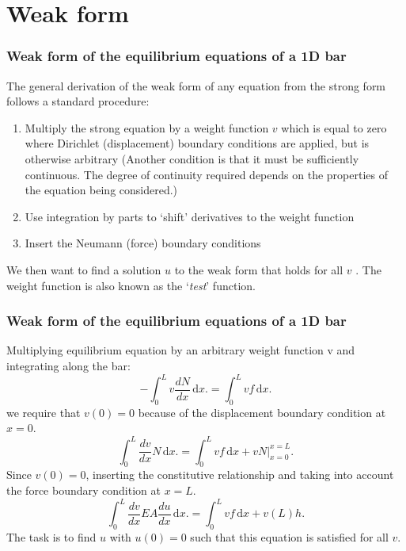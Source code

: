\documentclass[notes]{beamer}
\begin{document}
\section{Weak form}
\begin{frame}
\frametitle{Weak form of the equilibrium equations of a 1D bar}
The general derivation of the weak form of any equation from the strong form
follows a standard procedure:

\begin{enumerate}
	\item Multiply the strong equation by a weight function $v$ which is equal to zero where
	Dirichlet (displacement) boundary conditions are applied, but is otherwise arbitrary 
	(Another condition is that it must be sufficiently continuous. The degree of continuity 
	required depends on the properties of the equation being considered.)
	\item Use integration by parts to `shift' derivatives to the weight function
	\item Insert the Neumann (force) boundary conditions
\end{enumerate}

We then want to find a solution $u$ to the weak form that holds for all $v$ . The weight
function is also known as the `\textit{test}' function.
\end{frame}

\begin{frame}
\frametitle{Weak form of the equilibrium equations of a 1D bar}
Multiplying equilibrium equation by an arbitrary weight function v and
integrating along the bar:
\begin{equation*}
-\int_0^L v \frac{dN}{dx}\, \mathrm{d}x. = \int_0^L v f\, \mathrm{d}x.
\end{equation*}
we require that $v(0) = 0$ because of the displacement boundary condition at $x = 0$.
\begin{equation*}
\int_0^L \frac{dv}{dx} N\, \mathrm{d}x. = \int_0^L v f\, \mathrm{d}x + v N |_{x=0}^{x=L}.
\end{equation*}
Since $v(0) = 0$, inserting the constitutive relationship and taking into account the force
boundary condition at $x = L$.
\begin{equation*}
\int_0^L \frac{dv}{dx} EA \frac{du}{dx}\, \mathrm{d}x. = \int_0^L v f\, \mathrm{d}x + v(L)h.
\end{equation*}
The task is to find $u$ with $u(0) = 0$ such that this equation is satisfied for all $v$.
\end{frame}
\end{document}
